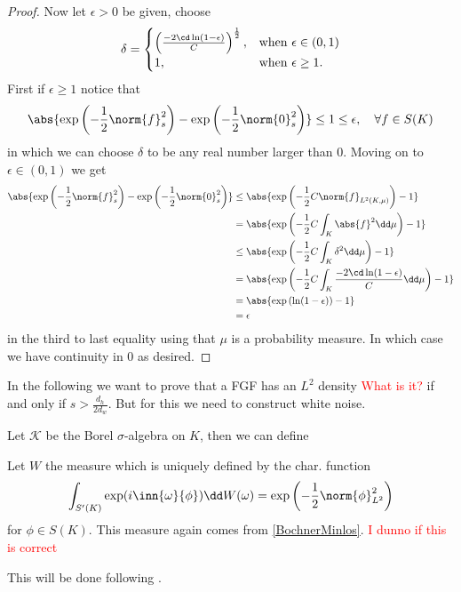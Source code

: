 \begin{proof}
Now let $\epsilon > 0$ be given, choose $$\delta = \begin{cases}
	\left(\frac{-2\cd \ln(1-\epsilon)}{C}\right)^{\frac{1}{2}}, & \text{when } \epsilon \in (0,1) \\
	1,& \text{when } \epsilon \geq 1.
\end{cases}$$
First if $\epsilon \geq 1$ notice that 
\begin{equation}
	\abs{\exp\left(-\frac{1}{2} \norm{f}_{s}^{2}\right) - \exp\left(-\frac{1}{2} \norm{0}_{s}^{2}\right)} \leq 1 \leq \epsilon, \quad \forall f \in S(K)
\end{equation} 
in which we can choose $\delta$ to be any real number larger than $0$. Moving on to $\epsilon \in (0,1)$ we get
\begin{align}
	\abs{\exp\left(-\frac{1}{2} \norm{f}_{s}^{2}\right) - \exp\left(-\frac{1}{2} \norm{0}_{s}^{2}\right)} &\leq \abs{\exp\left(-\frac{1}{2} C\norm{f}_{L^2(K,\mu)}\right) - 1} \\
	&= \abs{\exp\left(-\frac{1}{2} C \int_{K}\abs{f}^2 \dd \mu\right) - 1} \\
	&\leq \abs{\exp\left(-\frac{1}{2} C \int_{K} \delta^2 \dd \mu\right) - 1} \\
	&= \abs{\exp\left(-\frac{1}{2} C \int_{K} \frac{-2\cd \ln(1-\epsilon)}{ C} \dd \mu\right) - 1}  \\
	&= \abs{\exp\left(\ln(1-\epsilon)\right) -1}\\
	& = \epsilon
\end{align}
in the third to last equality using that $\mu$ is a probability measure. In which case we have continuity in $0$ as desired.
\end{proof}


In the following we want to prove that a FGF has an $L^2$ density \textcolor{red}{What is it?} if and only if $s > \frac{d_h}{2d_w}$. But for this we need to construct white noise.  

Let $\mathcal{K}$ be the Borel $\sigma$-algebra on $K$, then we can define

Let $W$ the measure which is uniquely defined by the char. function 
\begin{equation}
	\int_{S'(K)} \exp(i \inn{\omega}{\phi}) \dd W(\omega) = \exp\left(-\frac{1}{2}\norm{\phi}_{L^2}^{2}\right)
\end{equation}
for $\phi \in S(K)$. This measure again comes from \cref{BochnerMinlos}. \textcolor{red}{I dunno if this is correct}


This will be done following \cite{LeGall}.

